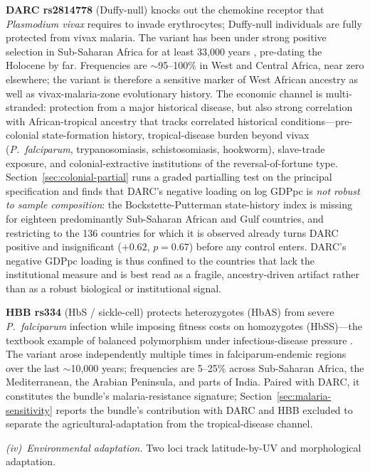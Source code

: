\documentclass[11pt,letterpaper]{article}
\begin{document}
\textbf{DARC rs2814778} (Duffy-null) knocks out the chemokine receptor that \emph{Plasmodium vivax} requires to invade erythrocytes; Duffy-null individuals are fully protected from vivax malaria. The variant has been under strong positive selection in Sub-Saharan Africa for at least 33{,}000 years \citep{howes2011}, pre-dating the Holocene by far. Frequencies are $\sim$95--100\% in West and Central Africa, near zero elsewhere; the variant is therefore a sensitive marker of West African ancestry as well as vivax-malaria-zone evolutionary history. The economic channel is multi-stranded: protection from a major historical disease, but also strong correlation with African-tropical ancestry that tracks correlated historical conditions---pre-colonial state-formation history, tropical-disease burden beyond vivax (\emph{P.\ falciparum}, trypanosomiasis, schistosomiasis, hookworm), slave-trade exposure, and colonial-extractive institutions of the \citet{acemoglu2002reversal} reversal-of-fortune type. Section~\ref{sec:colonial-partial} runs a graded partialling test on the principal specification and finds that DARC's negative loading on log GDPpc is \emph{not robust to sample composition}: the Bockstette-Putterman state-history index is missing for eighteen predominantly Sub-Saharan African and Gulf countries, and restricting to the 136 countries for which it is observed already turns DARC positive and insignificant ($+0.62$, $p=0.67$) before any control enters. DARC's negative GDPpc loading is thus confined to the countries that lack the institutional measure and is best read as a fragile, ancestry-driven artifact rather than as a robust biological or institutional signal.

\textbf{HBB rs334} (HbS / sickle-cell) protects heterozygotes (HbAS) from severe \emph{P.\ falciparum} infection while imposing fitness costs on homozygotes (HbSS)---the textbook example of balanced polymorphism under infectious-disease pressure \citep{piel2010}. The variant arose independently multiple times in falciparum-endemic regions over the last $\sim$10{,}000 years; frequencies are 5--25\% across Sub-Saharan Africa, the Mediterranean, the Arabian Peninsula, and parts of India. Paired with DARC, it constitutes the bundle's malaria-resistance signature; Section~\ref{sec:malaria-sensitivity} reports the bundle's contribution with DARC and HBB excluded to separate the agricultural-adaptation from the tropical-disease channel.

\emph{(iv)~Environmental adaptation.} Two loci track latitude-by-UV and morphological adaptation.
\end{document}
